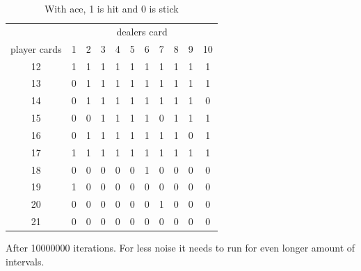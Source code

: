 \documentclass{article}
\begin{document}
    \begin{table}[H]
    \centering
    \begin{tabular}{c|c|c|c|c|c|c|c|c|c|c}
    &\multicolumn{10}{c}{dealers card} \\
    player cards&1 & 2 & 3 & 4 & 5 & 6 & 7 & 8 & 9 & 10 \\
            \hline
    12 & 1 & 1 & 1 & 1 & 1 & 1 & 1 & 1 & 1 & 1 \\
    13 & 0 & 1 & 1 & 1 & 1 & 1 & 1 & 1 & 1 & 1 \\
    14 & 0 & 1 & 1 & 1 & 1 & 1 & 1 & 1 & 1 & 0 \\
    15 & 0 & 0 & 1 & 1 & 1 & 1 & 0 & 1 & 1 & 1 \\
    16 & 0 & 1 & 1 & 1 & 1 & 1 & 1 & 1 & 0 & 1 \\
    17 & 1 & 1 & 1 & 1 & 1 & 1 & 1 & 1 & 1 & 1 \\
    18 & 0 & 0 & 0 & 0 & 0 & 1 & 0 & 0 & 0 & 0 \\
    19 & 1 & 0 & 0 & 0 & 0 & 0 & 0 & 0 & 0 & 0 \\
    20 & 0 & 0 & 0 & 0 & 0 & 0 & 1 & 0 & 0 & 0 \\
    21 & 0 & 0 & 0 & 0 & 0 & 0 & 0 & 0 & 0 & 0 \\
    \end{tabular}
    \caption{With ace, 1 is hit and 0 is stick}
\end{table}

After 10000000 iterations. For less noise it needs to run for even longer amount of intervals.
\end{document}
